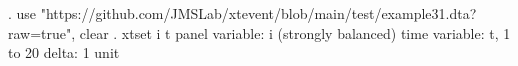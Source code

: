 . use "https://github.com/JMSLab/xtevent/blob/main/test/example31.dta?raw=true", clear
{\smallskip}
. xtset i t
       panel variable:  i (strongly balanced)
        time variable:  t, 1 to 20
                delta:  1 unit
{\smallskip}
